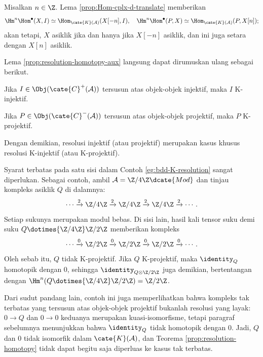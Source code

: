 \begin{bukti}
	Misalkan $n\in\Z$. Lema \ref{prop:Hom-cplx-d-translate} memberikan
	\[
	\Hm^n \Hom^\bullet(X, I) \simeq
	\Hom_{\cate{K}(\mathcal{A})}(X[-n], I), \quad
	\Hm^n \Hom^\bullet(P, X) \simeq
	\Hom_{\cate{K}(\mathcal{A})}(P, X[n]);
	\]
	akan tetapi, $X$ asiklik jika dan hanya jika $X[-n]$ asiklik, dan ini
	juga setara dengan $X[n]$ asiklik.
\end{bukti}

\begin{contoh}\label{eg:bdd-K-resolution}
	Lema \ref{prop:resolution-homotopy-aux} langsung dapat dirumuskan ulang
	sebagai berikut.
	\begin{compactitem}
		\item Jika $I\in\Obj(\cate{C}^+(\mathcal{A}))$ tersusun atas
		objek-objek injektif, maka $I$ K-injektif.
		\item Jika $P\in\Obj(\cate{C}^-(\mathcal{A}))$ tersusun atas
		objek-objek projektif, maka $P$ K-projektif.
	\end{compactitem}
	Dengan demikian, resolusi injektif (atau projektif) merupakan kasus khusus
	resolusi K-injektif (atau K-projektif).
\end{contoh}

\begin{contoh}[A.\ Dold]
	Syarat terbatas pada satu sisi dalam Contoh
	\ref{eg:bdd-K-resolution} sangat diperlukan. Sebagai contoh, ambil
	$\mathcal{A}=\Z/4\Z\dcate{Mod}$ dan tinjau kompleks asiklik $Q$
	di dalamnya:
	\[
	\cdots \xrightarrow{2} \Z/4\Z \xrightarrow{2} \Z/4\Z
	\xrightarrow{2} \Z/4\Z \xrightarrow{2} \cdots.
	\]
	Setiap sukunya merupakan modul bebas. Di sisi lain, hasil kali tensor
	suku demi suku $Q \dotimes{\Z/4\Z} \Z/2\Z$ memberikan kompleks
	\[
	\cdots \xrightarrow{0} \Z/2\Z \xrightarrow{0} \Z/2\Z
	\xrightarrow{0} \Z/2\Z \xrightarrow{0} \cdots.
	\]
	Oleh sebab itu, $Q$ tidak K-projektif. Jika $Q$ K-projektif, maka
	$\identity_Q$ homotopik dengan $0$, sehingga
	$\identity_{Q \otimes \Z/2\Z}$ juga demikian, bertentangan dengan
	$\Hm^n(Q \dotimes{\Z/4\Z} \Z/2\Z)=\Z/2\Z$.

	Dari sudut pandang lain, contoh ini juga memperlihatkan bahwa kompleks tak
	terbatas yang tersusun atas objek-objek projektif bukanlah resolusi yang
	layak: $0\to Q$ dan $0\to0$ keduanya merupakan kuasi-isomorfisme, tetapi
	paragraf sebelumnya menunjukkan bahwa $\identity_Q$ tidak homotopik dengan
	$0$. Jadi, $Q$ dan $0$ tidak isomorfik dalam
	$\cate{K}(\mathcal{A})$, dan Teorema \ref{prop:resolution-homotopy}
	tidak dapat begitu saja diperluas ke kasus tak terbatas.
\end{contoh}

